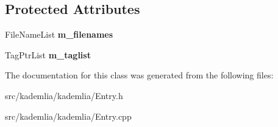 \subsection*{Protected Attributes}
\begin{DoxyCompactItemize}
\item 
FileNameList {\bfseries m\_\-filenames}\label{classKademlia_1_1CEntry_a696337e727d3b169bd01acbd8424c596}

\item 
TagPtrList {\bfseries m\_\-taglist}\label{classKademlia_1_1CEntry_a96cb48ab35b974eef49f35613afd6fc5}

\end{DoxyCompactItemize}


The documentation for this class was generated from the following files:\begin{DoxyCompactItemize}
\item 
src/kademlia/kademlia/Entry.h\item 
src/kademlia/kademlia/Entry.cpp\end{DoxyCompactItemize}
